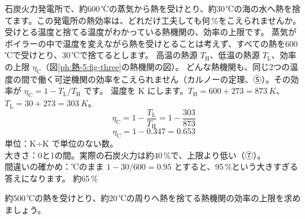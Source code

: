 \begin{kotoba}
\small
{}
\end{kotoba}

{}

\label{ph:熱-5:ex1}
\begin{phreidai}
石炭火力発電所で、約600\,℃の蒸気から熱を受けとり、約30\,℃の海の水へ熱を捨てます。この発電所の熱効率は、どれだけ工夫しても何\,\%をこえられませんか。
\phbamen
受けとる温度と捨てる温度がわかっている熱機関の、効率の上限です。
\phmushi
蒸気がボイラーの中で温度を変えながら熱を受けとることは考えず、すべての熱を600\,℃で受けとり、30\,℃で捨てるとします。
\phzu
高温の熱源 $T_{\mathrm H}$、低温の熱源 $T_{\mathrm L}$、効率の上限 $\eta_{\mathrm C}$（図\ref{ph:熱-5:fig-three}の熱機関の図）。
\phriyu
どんな熱機関も、同じ2つの温度の間で働く可逆機関の効率をこえられません（カルノーの定理、⑤）。その効率が $\eta_{\mathrm C}=1-T_{\mathrm L}/T_{\mathrm H}$ です。
\phtateru
温度を K にします。$T_{\mathrm H}=600+273=\qty{873}{K}$、$T_{\mathrm L}=30+273=\qty{303}{K}$。
\[\eta_{\mathrm C}=1-\frac{T_{\mathrm L}}{T_{\mathrm H}}=1-\frac{303}{873}\]
\phtoku
\[\eta_{\mathrm C}=1-0.347=0.653\]
\phtashikame
単位：K÷K で単位のない数。\\
大きさ：0と1の間。実際の石炭火力は約40\,\%で、上限より低い（⑦）。\\
間違いの確かめ：℃のまま $1-30/600=0.95$ とすると、95\,\%という大きすぎる答えになります。
\kotae 約65\,\%
\end{phreidai}
\begin{jibun}
約500\,℃の熱を受けとり、約20\,℃の周りへ熱を捨てる熱機関の効率の上限を求めましょう。
\end{jibun}

